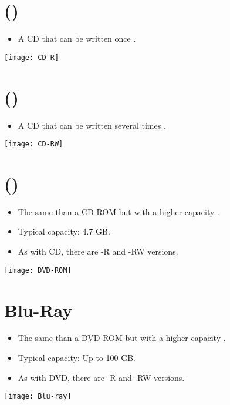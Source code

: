 \section{ ({)}}
\begin{itemize}
\item A \gls{CD} that can be written once \cite{wikipedia_CD-R}.
\end{itemize}
\vspace{-2ex}
\begin{center}
  \texttt{[image: CD-R]}
\end{center}

\section{ ({)}}
\begin{itemize}
\item A \gls{CD} that can be written several times \cite{wikipedia_CD-RW}.
\end{itemize}
\vspace{-2ex}
\begin{center}
  \texttt{[image: CD-RW]}
\end{center}

\section{ ({)}}
\begin{itemize}
\item The same than a \gls{CD-ROM} but with a higher capacity
  \cite{wikipedia_DVD}.
\item Typical capacity: 4.7 GB.
\item As with \gls{CD}, there are -R and -RW versions.
\end{itemize}
\vspace{-6ex}
\begin{flushright}
  \texttt{[image: DVD-ROM]}
\end{flushright}

\section{Blu-Ray}
\begin{itemize}
\item The same than a \gls{DVD-ROM} but with a higher capacity
  \cite{BR}.
\item Typical capacity: Up to 100 GB.
\item As with \gls{DVD}, there are -R and -RW versions.
\end{itemize}
\vspace{-14ex}
\begin{flushright}
  \texttt{[image: Blu-ray]}
\end{flushright}

